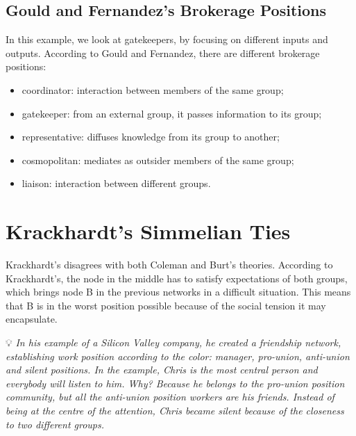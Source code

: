 \documentclass[
  notitlepage,
  onecolumn,
  openany]{book}
\providecommand{\tightlist}{%
  \setlength{\itemsep}{0pt}\setlength{\parskip}{0pt}}
\begin{document}
\hypertarget{gould-and-fernandezs-brokerage-positions}{%
\subsection{Gould and Fernandez's Brokerage Positions}\label{gould-and-fernandezs-brokerage-positions}}

In this example, we look at gatekeepers, by focusing on different inputs and outputs. According to Gould and Fernandez, there are different brokerage positions:

\begin{itemize}
\tightlist
\item
  coordinator: interaction between members of the same group;
\item
  gatekeeper: from an external group, it passes information to its group;
\item
  representative: diffuses knowledge from its group to another;
\item
  cosmopolitan: mediates as outsider members of the same group;
\item
  liaison: interaction between different groups.
\end{itemize}

\hypertarget{krackhardts-simmelian-ties}{%
\section{Krackhardt's Simmelian Ties}\label{krackhardts-simmelian-ties}}

Krackhardt's disagrees with both Coleman and Burt's theories. According to Krackhardt's, the node in the middle has to satisfy expectations of both groups, which brings node B in the previous networks in a difficult situation. This means that B is in the worst position possible because of the social tension it may encapsulate.

💡 \emph{In his example of a Silicon Valley company, he created a friendship network, establishing work position according to the color: manager, pro-union, anti-union and silent positions. In the example, Chris is the most central person and everybody will listen to him. Why? Because he belongs to the pro-union position community, but all the anti-union position workers are his friends. Instead of being at the centre of the attention, Chris became silent because of the closeness to two different groups.}
\end{document}
